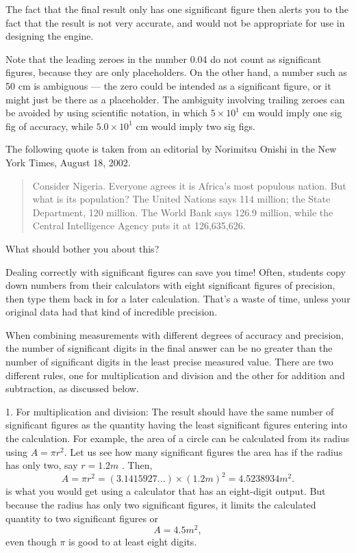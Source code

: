 \noindent The fact that the final result only has one significant
figure then alerts you to the fact that the result is not
very accurate, and would not be appropriate for use in
designing the engine.

Note that the leading zeroes in the number 0.04 do not count
as significant figures, because they are only placeholders.
On the other hand, a number such as 50 cm is ambiguous ---
the zero could be intended as a significant figure, or it
might just be there as a placeholder. The ambiguity
involving trailing zeroes can be avoided by using scientific
notation, in which $5\times10^1$  cm would imply one sig fig of
accuracy, while $5.0\times10^1$  cm would imply two sig figs.

\begin{exmp}
The following quote is taken from an editorial by
Norimitsu Onishi in the New York Times, August 18, 2002.

\noindent 
\begin{quote}
\noindent Consider Nigeria. Everyone agrees it is Africa's most
populous nation. But what is its population? The United
Nations says 114 million; the State Department, 120 million.
The World Bank says 126.9 million, while the Central
Intelligence Agency puts it at 126,635,626.
\end{quote}

\noindent What should bother you about this?
\end{exmp}
\divider

Dealing correctly with significant figures can save you
time! Often, students copy down numbers from their
calculators with eight significant figures of precision,
then type them back in for a later calculation. That's a
waste of time, unless your original data had that kind of
incredible precision.

When combining measurements with different degrees of accuracy and precision, the number of significant digits in the final answer can be no greater than the number of significant digits in the least precise measured value. There are two different rules, one for multiplication and division and the other for addition and subtraction, as discussed below.

1. For multiplication and division: The result should have the same number of significant figures as the quantity having the least significant figures entering into the calculation. For example, the area of a circle can be calculated from its radius using $A = \pi r^2$. Let us see how many significant figures the area has if the radius has only two, say $r = 1.2 m$ . Then,
$$A = \pi r^2 = (3.1415927...)\times (1.2 m)^2 = 4.5238934 m^2.$$
is what you would get using a calculator that has an eight-digit output. But because the radius has only two significant figures, it limits the calculated quantity to two significant figures or
$$A=4.5 m^2,$$ 
even though $\pi$ is good to at least eight digits.

